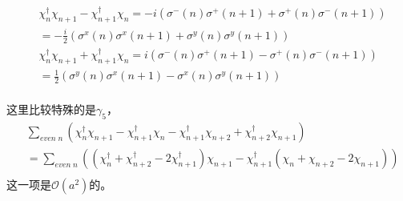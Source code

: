 \begin{equation}
\begin{split}
&\chi^{\dagger}_n\chi_{n+1}-\chi^{\dagger}_{n+1}\chi _n = -i \left(\sigma ^-(n)\sigma ^+(n+1)+\sigma ^+(n)\sigma ^- (n+1)\right)\\
&=-\frac{i}{2}\left(\sigma ^x(n)\sigma ^x(n+1)+\sigma ^y(n)\sigma ^y(n+1)\right)\\
&\chi^{\dagger}_n\chi_{n+1}+\chi^{\dagger}_{n+1}\chi _n = i\left(\sigma ^-(n)\sigma ^+(n+1)-\sigma ^+(n)\sigma ^- (n+1)\right) \\
&= \frac{1}{2}\left(\sigma ^y(n)\sigma ^x(n+1)-\sigma ^x(n)\sigma ^y(n+1)\right)\\
\end{split}
\end{equation}

这里比较特殊的是$\gamma _5$，
\begin{equation}
\begin{split}
&\sum _{even\;n}\left(\chi^{\dagger}_n\chi_{n+1}-\chi^{\dagger}_{n+1}\chi _n -\chi^{\dagger}_{n+1}\chi_{n+2} + \chi^{\dagger}_{n+2}\chi _{n+1} \right)\\
&=\sum _{even\;n}\left((\chi^{\dagger}_n+\chi^{\dagger}_{n+2}-2\chi^{\dagger}_{n+1})\chi_{n+1}-\chi^{\dagger}_{n+1}(\chi _n +\chi _{n+2}-2\chi _{n+1})\right)\\
\end{split}
\end{equation}
这一项是$\mathcal{O}(a^2)$的。

